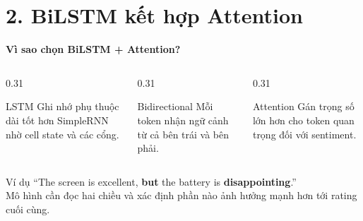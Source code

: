 \documentclass[aspectratio=169]{beamer}
\begin{document}
\section{2. BiLSTM kết hợp Attention}

\begin{frame}{\textbf{\large Vì sao chọn BiLSTM + Attention?}}
    \begin{columns}[T,onlytextwidth]
        \begin{column}{0.31\textwidth}
            \begin{block}{LSTM}
                \centering
                Ghi nhớ phụ thuộc dài tốt hơn SimpleRNN nhờ cell state và các cổng.
            \end{block}
        \end{column}

        \begin{column}{0.31\textwidth}
            \begin{block}{Bidirectional}
                \centering
                Mỗi token nhận ngữ cảnh từ cả bên trái và bên phải.
            \end{block}
        \end{column}

        \begin{column}{0.31\textwidth}
            \begin{block}{Attention}
                \centering
                Gán trọng số lớn hơn cho token quan trọng đối với sentiment.
            \end{block}
        \end{column}
    \end{columns}

    \vspace{0.55cm}
    \begin{exampleblock}{Ví dụ}
        ``The screen is excellent, \textbf{but} the battery is
        \textbf{disappointing}.''\\
        Mô hình cần đọc hai chiều và xác định phần nào ảnh hưởng mạnh hơn tới
        rating cuối cùng.
    \end{exampleblock}
\end{frame}
\end{document}
